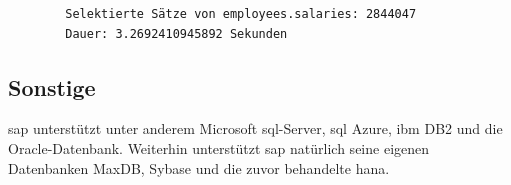 \begin{center}
	\begin{verbatim}
		Selektierte Sätze von employees.salaries: 2844047 
		Dauer: 3.2692410945892 Sekunden 
	\end{verbatim}
\end{center}

\subsection{Sonstige}
\label{sec:db-sonstige}
\gls{sap} unterstützt unter anderem Microsoft \gls{sql}-Server, \gls{sql} Azure, \gls{ibm} DB2 und die Oracle-Datenbank. Weiterhin unterstützt \gls{sap} natürlich seine eigenen Datenbanken MaxDB, Sybase und die zuvor behandelte \gls{hana}.